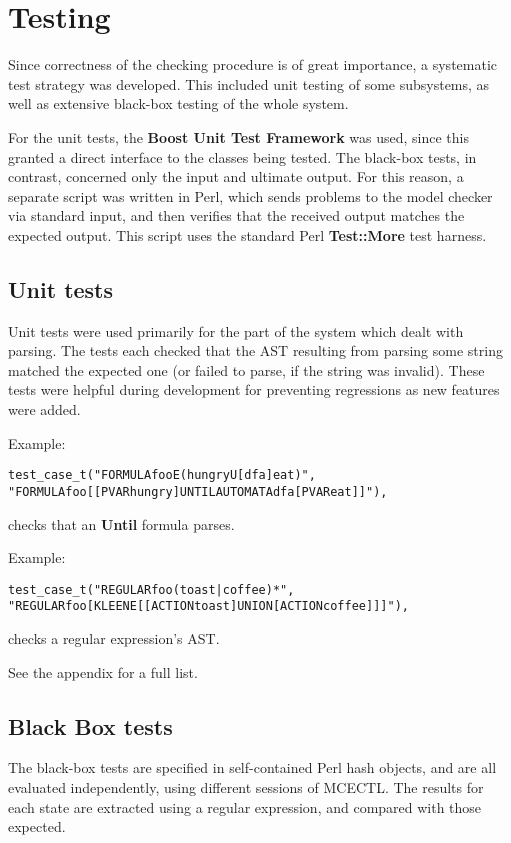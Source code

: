 \documentclass[11pt]{article}
\theoremstyle{definition}
\begin{document}

\section{Testing}

Since correctness of the checking procedure is of great importance, a
systematic test strategy was developed. This included unit testing of some
subsystems, as well as extensive black-box testing of the whole system.

For the unit tests, the \textbf{Boost Unit Test Framework} was used, since this
granted a direct interface to the classes being tested. The black-box tests, in
contrast, concerned only the input and ultimate output. For this reason, a
separate script was written in Perl, which sends problems to the model checker
via standard input, and then verifies that the received output matches the
expected output. This script uses the standard Perl \textbf{Test::More} test
harness.

\subsection{Unit tests}

Unit tests were used primarily for the part of the system which dealt with
parsing. The tests each checked that the AST resulting from parsing some string
matched the expected one (or failed to parse, if the string was invalid). These
tests were helpful during development for preventing regressions as new
features were added.

Example:
\begin{alltt}
test_case_t("FORMULA foo { E(hungry U[dfa] eat) }",
         "FORMULA foo { [[PVAR hungry] UNTIL {AUTOMATA dfa} [PVAR eat]] }"),
\end{alltt}
checks that an \textbf{Until} formula parses.

Example:
\begin{alltt}
test_case_t("REGULAR foo { (toast|coffee)* }",
         "REGULAR foo { [KLEENE [[ACTION toast] UNION [ACTION coffee]]] }"),
\end{alltt}
checks a regular expression's AST.

See the appendix for a full list.

\subsection{Black Box tests}

The black-box tests are specified in self-contained Perl hash objects, and are
all evaluated independently, using different sessions of MCECTL. The results
for each state are extracted using a regular expression, and compared with
those expected.
\end{document}
